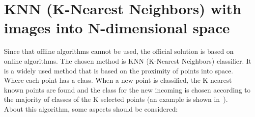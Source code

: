 \section{KNN (K-Nearest Neighbors) with images into N-dimensional space}\label{sec:knn}
Since that offline algorithms cannot be used, the official solution is based on online algorithms. The chosen method is KNN (K-Nearest Neighbors) classifier. It is a widely used method that is based on the proximity of points into space. Where each point has a class. When a new point is classified, the K nearest known points are found and the class for the new incoming is chosen according to the majority of classes of the K selected points (an example is shown in~).\\
About this algorithm, some aspects should be considered:

